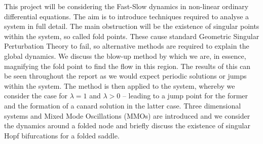 This project will be considering the Fast-Slow dynamics in non-linear ordinary differential equations. The aim is to introduce techniques required to analyse a system in full detail. The main obstruction will be the existence of singular points within the system, so called fold points. These cause standard Geometric Singular Perturbation Theory to fail, so alternative methods are required to explain the global dynamics. We discuss the blow-up method by which we are, in essence, magnifying the fold point to find the flow in this region. The results of this can be seen throughout the report as we would expect periodic solutions or jumps within the system. The method is then applied to the \vdp system, whereby we consider the case for $ \lambda=1 $ and $ \lambda>0 $ -- leading to a jump point for the former and the formation of a canard solution in the latter case. Three dimensional systems and Mixed Mode Oscillations (MMOs) are introduced and we consider the dynamics around a folded node and briefly discuss the existence of singular Hopf bifurcations for a folded saddle.